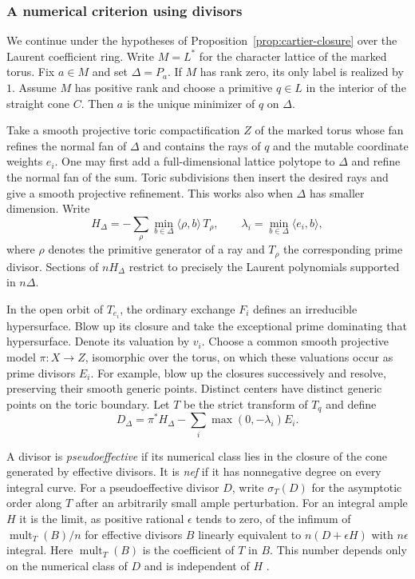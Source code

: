 \documentclass[11pt,reqno]{amsart}
\numberwithin{equation}{section}
\theoremstyle{definition}
\theoremstyle{remark}
\begin{document}
\subsubsection{A numerical criterion using divisors}
\label{subsec:exchange-divisor-realization}

We continue under the hypotheses of Proposition~\ref{prop:cartier-closure}
over the Laurent coefficient ring. Write \(M=L^*\) for the character
lattice of the marked torus. Fix \(a\in M\) and set \(\Delta=P_a\).
If \(M\) has rank zero, its only label is realized by \(1\).
Assume \(M\) has positive rank and choose a primitive \(q\in L\)
in the interior of the straight cone \(C\).
Then \(a\) is the unique minimizer of \(q\) on \(\Delta\).

Take a smooth projective toric compactification \(Z\) of the marked
torus whose fan refines the normal fan of \(\Delta\) and contains the
rays of \(q\) and the mutable coordinate weights \(e_i\).
One may first add a full-dimensional lattice polytope to \(\Delta\)
and refine the normal fan of the sum. Toric subdivisions then insert
the desired rays and give a smooth projective refinement. This works
also when \(\Delta\) has smaller dimension. Write
\[ H_\Delta=-\sum_\rho \min_{b\in\Delta}\langle \rho,b\rangle\,T_\rho , \qquad \lambda_i=\min_{b\in\Delta}\langle e_i,b\rangle , \]
where \(\rho\) denotes the primitive generator of a ray and \(T_\rho\)
the corresponding prime divisor. Sections of \(nH_\Delta\) restrict
to precisely the Laurent polynomials supported in \(n\Delta\).

In the open orbit of \(T_{e_i}\), the ordinary exchange \(F_i\)
defines an irreducible hypersurface. Blow up its closure and take the
exceptional prime dominating that hypersurface. Denote its valuation
by \(v_i\). Choose a common smooth projective model
\(\pi:X\longrightarrow Z\), isomorphic over the torus, on which these
valuations occur as prime divisors \(E_i\). For example, blow up the
closures successively and resolve, preserving their smooth generic
points. Distinct centers have distinct generic points on the toric
boundary. Let \(T\) be the strict transform of \(T_q\) and define
\[ D_\Delta=\pi^*H_\Delta-\sum_i\max(0,-\lambda_i)E_i. \]

A divisor is \emph{pseudoeffective} if its numerical class lies in the
closure of the cone generated by effective divisors. It is \emph{nef}
if it has nonnegative degree on every integral curve.
For a pseudoeffective divisor \(D\), write \(\sigma_T(D)\) for the
asymptotic order along \(T\) after an arbitrarily small ample
perturbation. For an integral ample \(H\) it is the limit, as positive
rational \(\epsilon\) tends to zero, of the infimum of
\(\operatorname{mult}_T(B)/n\) for effective divisors \(B\) linearly
equivalent to \(n(D+\epsilon H)\) with \(n\epsilon\) integral. Here
\(\operatorname{mult}_T(B)\) is the coefficient of \(T\) in \(B\). This number
depends only on the numerical class of \(D\) and is independent of
\(H\) \cite[III, \S1]{Nakayama}.
\end{document}
